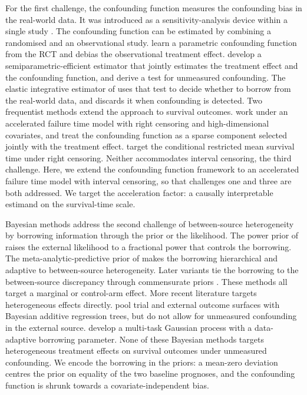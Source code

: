 For the first challenge, the confounding function measures the confounding bias in the real-world data.
It was introduced as a sensitivity-analysis device within a single study \citep{robins2000sensitivity}.
The confounding function can be estimated by combining a randomised and an observational study.
\citet{Kallus2018} learn a parametric confounding function from the RCT and debias the observational treatment effect.
\citet{YangLiuZengWang2025} develop a semiparametric-efficient estimator that jointly estimates the treatment effect and the confounding function, and derive a test for unmeasured confounding.
The elastic integrative estimator of \citet{yang2023elastic} uses that test to decide whether to borrow from the real-world data, and discards it when confounding is detected.
Two frequentist methods extend the approach to survival outcomes.
\citet{Ye2025} work under an accelerated failure time model with right censoring and high-dimensional covariates, and treat the confounding function as a sparse component selected jointly with the treatment effect.
\citet{mao2025statistical} target the conditional restricted mean survival time under right censoring.
Neither accommodates interval censoring, the third challenge.
Here, we extend the confounding function framework to an accelerated failure time model with interval censoring, so that challenges one and three are both addressed.
We target the acceleration factor: a causally interpretable estimand on the survival-time scale.

Bayesian methods address the second challenge of between-source heterogeneity by borrowing information through the prior or the likelihood.
The power prior of \citet{ibrahim2000power} raises the external likelihood to a fractional power that controls the borrowing.
The meta-analytic-predictive prior of \citet{neuenschwander2010} makes the borrowing hierarchical and adaptive to between-source heterogeneity.
Later variants tie the borrowing to the between-source discrepancy through commensurate priors \citep{hobbs2012commensurate}.
These methods all target a marginal or control-arm effect.
More recent literature targets heterogeneous effects directly.
\citet{zhou2021incorporating} pool trial and external outcome surfaces with Bayesian additive regression trees, but do not allow for unmeasured confounding in the external source.
\citet{dimitriou2025causal} develop a multi-task Gaussian process with a data-adaptive borrowing parameter.
None of these Bayesian methods targets heterogeneous treatment effects on survival outcomes under unmeasured confounding.
We encode the borrowing in the priors: a mean-zero deviation centres the prior on equality of the two baseline prognoses, and the confounding function is shrunk towards a covariate-independent bias.

